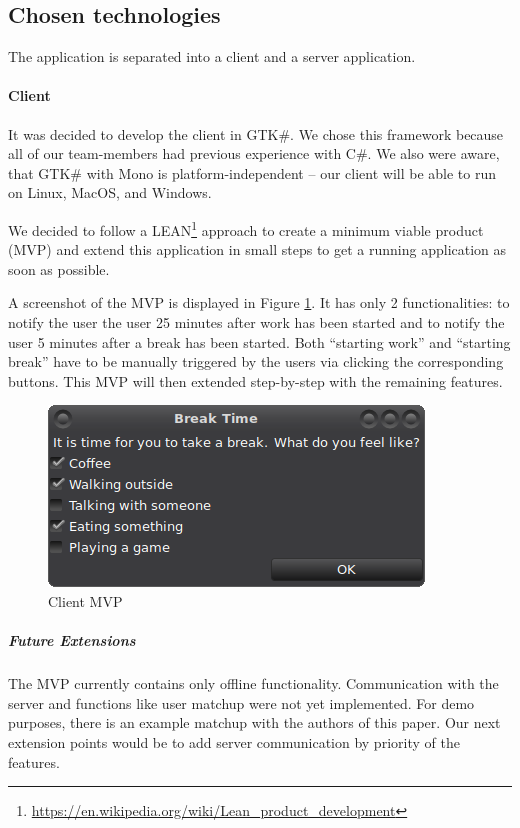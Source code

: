 \subsection{Chosen technologies}
The application is separated into a client and a server application.



\paragraph{Client} It was decided to develop the client in GTK\#. We chose this framework because all of our 
team-members had previous experience with C\#. We also were aware, that GTK\# with Mono is platform-independent -- our 
client will be able to run on Linux, MacOS, and Windows.

We decided to follow a LEAN\footnote{\url{https://en.wikipedia.org/wiki/Lean_product_development}} approach to create 
a minimum viable product (MVP) and extend this application in small steps to get a running application as soon as 
possible.

A screenshot of the MVP is displayed in Figure \ref{fig:mvp-screenshot}. It has only 2 functionalities: to notify the 
user the user 25 minutes after work has been started and to notify the user 5 minutes after a break has been started. 
Both ``starting work'' and ``starting break'' have to be manually triggered by the users via clicking the 
corresponding buttons. This MVP will then extended step-by-step with the remaining features.

\begin{figure}
  \centering
  \includegraphics{images/mvp-screenshot.png}
  \caption{Client MVP}
  \label{fig:mvp-screenshot}
\end{figure}

\subparagraph{Future Extensions}
The MVP currently contains only offline functionality. Communication with the server and functions like user matchup were not yet implemented. For demo purposes, there is an example matchup with the authors of this paper. Our next extension points would be to add server communication by priority of the features.


